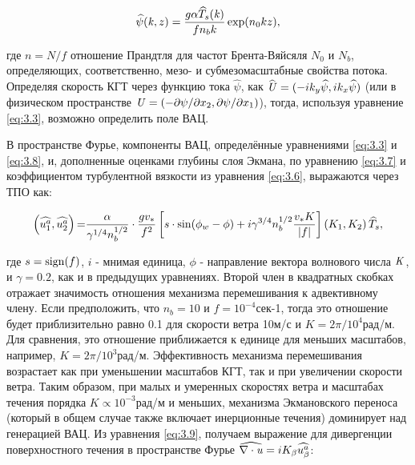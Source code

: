 \begin{equation} \label{eq:3.8} \widehat{\psi }({\it k},z)=\frac{g\alpha \widehat{T}_{s} ({\it k})}{fn_{b} k} \exp (n_{0} kz),  \end{equation} 



\noindent где $n=N/f$ отношение Прандтля для частот Брента-Вяйсяля $N_{0} $ и $N_{b} $, определяющих, соответственно, мезо- и субмезомасштабные свойства потока. Определяя скорость КГТ через функцию тока $\widehat{\psi }$, как $\widehat{{\it U}}=(-ik_{y} \widehat{\psi },ik_{x} \widehat{\psi })$ (или в физическом пространстве ${\it U}=(-\partial \psi /\partial x_{2} ,\partial \psi /\partial x_{1} )$), тогда, используя уравнение \eqref{eq:3.3}, возможно определить поле ВАЦ. 

В пространстве Фурье, компоненты ВАЦ, определённые уравнениями \eqref{eq:3.3} и \eqref{eq:3.8}, и, дополненные оценками глубины слоя Экмана, по уравнению \eqref{eq:3.7} и коэффициентом турбулентной вязкости из уравнения \eqref{eq:3.6}, выражаются через ТПО как:



\begin{equation} \label{eq:3.9} \left(\widehat{u_{1}^{a} },\widehat{u_{2}^{a} }\right){\rm =}\frac{\alpha }{\gamma ^{1/4} n_{b}^{1/2} } \cdot \frac{gv_{*} }{f^{2} } \left[s\cdot \sin (\phi _{w} -\phi )+i\gamma ^{3/4} n_{b}^{1/2} \frac{v_{*} K}{\left|f\right|} \right]\left(K_{1} ,K_{2} \right)\widehat{T}_{s} ,  \end{equation} 



\noindent где $s={\rm sign}(f)$, $i$ - мнимая единица, $\phi $ - направление вектора волнового числа ${\it K}$, и $\gamma =0.2$, как и в предыдущих уравнениях. Второй член в квадратных скобках отражает значимость отношения механизма перемешивания к адвективному члену. Если предположить, что $n_{b} =10$ и $f=10^{-4} $сек-1, тогда это отношение будет приблизительно равно 0.1 для скорости ветра 10м/с и $K=2\pi /10^{4} $рад/м. Для сравнения, это отношение приближается к единице для меньших масштабов, например, $K=2\pi /10^{3} $рад/м. Эффективность механизма перемешивания возрастает как при уменьшении масштабов КГТ, так и при увеличении скорости ветра. Таким образом, при малых и умеренных скоростях ветра и масштабах течения порядка $K\propto 10^{-3} $рад/м и меньших, механизма Экмановского переноса (который в общем случае также включает инерционные течения) доминирует над генерацией ВАЦ. Из уравнения \eqref{eq:3.9}, получаем выражение для дивергенции поверхностного течения в пространстве Фурье $\widehat{\nabla \cdot {\it u}}=iK_{\beta } \widehat{u_{\beta }^{a} }$:



